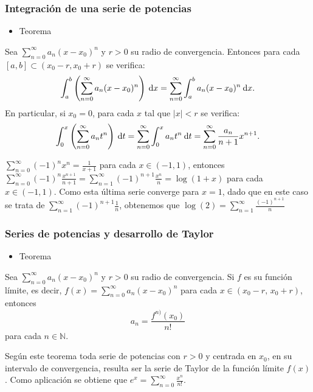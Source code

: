 \subsubsection{Integración de una serie de potencias}
\begin{itemize}[label=\color{red}\textbullet, leftmargin=*]
	\item \color{lightblue}Teorema
\end{itemize}
Sea $\sum_{n=0}^{\infty}a_n(x-x_0)^n$ y $r>0$ su radio de convergencia. Entonces para cada $[a,b]\subset(x_0-r,x_0+r)$ se verifica: \[ \int_{a}^{b}\left(\sum_{n=0}^{\infty}a_n(x-x_0)^{n}\right)\:\mathrm{d}x=\sum_{n=0}^{\infty}\int_{a}^{b}a_n(x-x_0)^{n}\:\mathrm{d}x. \]En particular, si $x_0=0$, para cada $x$ tal que $|x|<r$ se verifica: \[\int_0^{x}\left(\sum_{n=0}^{\infty}a_nt^n\right)\:\mathrm{d}t=\sum_{n=0}^{\infty}\int_{0}^{x}a_{n}t^{n}\:\mathrm{d}t=\sum_{n=0}^{\infty} \frac{a_{n}}{n+1}x^{n+1}.\]


$\sum_{n=0}^{\infty}(-1)^nx^n=\frac{1}{x+1}$ para cada $x \in(-1,1)$, entonces $\sum_{n=0}^{\infty}(-1)^{n} \frac{x^{n+1}}{n+1}=\sum_{n=1}^{\infty}(-1)^{n+1} \frac{x^n}{n}=\log(1+x)$ para cada $x \in(-1,1)$. Como esta última serie converge para $x=1$, dado que en este caso se trata de $\sum_{n=1}^{\infty}(-1)^{n+1} \frac{1}{n}$, obtenemos que $\log(2)=\sum_{n=1}^{\infty}\frac{(-1)^{n+1}}{n}$

\subsubsection{Series de potencias y desarrollo de Taylor}

\begin{itemize}[label=\color{red}\textbullet, leftmargin=*]
	\item \color{lightblue}Teorema
\end{itemize}
Sea $\sum_{n=0}^{\infty}a_{n}(x-x_{0})^{n}$ y $r>0$ su radio de convergencia. Si $f$ es su función límite, es decir, $f(x)=\sum_{n=0}^{\infty}a_{n}(x-x_{0})^{n}$ para cada $x \in(x_{0}-r,\,x_{0}+r)$, entonces
$$
a_{n}=\frac{f^{n)}(x_{0})}{n!}
$$
para cada $n \in\mathbb{N}$.

Según este teorema toda serie de potencias con $r>0$ y centrada en $x_{0}$, en su intervalo de convergencia, resulta ser la serie de Taylor de la función límite $f(x)$. Como aplicación se obtiene que $e^{x}=\sum_{n=0}^{\infty} \frac{x^{n}}{n!}$.

